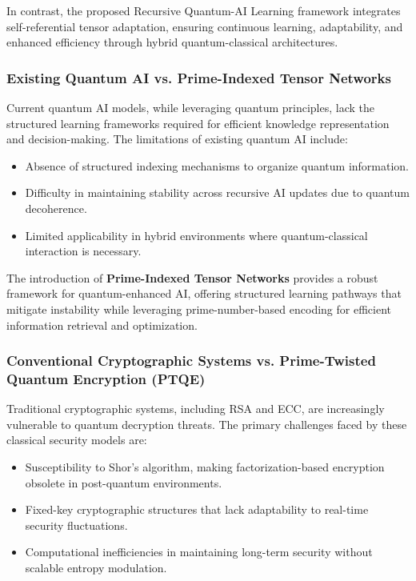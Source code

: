 \documentclass{article}
\theoremstyle{plain}
\begin{document}
In contrast, the proposed Recursive Quantum-AI Learning framework integrates self-referential tensor adaptation, ensuring continuous learning, adaptability, and enhanced efficiency through hybrid quantum-classical architectures.

\subsubsection{Existing Quantum AI vs. Prime-Indexed Tensor Networks}

Current quantum AI models, while leveraging quantum principles, lack the structured learning frameworks required for efficient knowledge representation and decision-making. The limitations of existing quantum AI include:
\begin{itemize}
    \item Absence of structured indexing mechanisms to organize quantum information.
    \item Difficulty in maintaining stability across recursive AI updates due to quantum decoherence.
    \item Limited applicability in hybrid environments where quantum-classical interaction is necessary.
\end{itemize}

The introduction of \textbf{Prime-Indexed Tensor Networks} provides a robust framework for quantum-enhanced AI, offering structured learning pathways that mitigate instability while leveraging prime-number-based encoding for efficient information retrieval and optimization.

\subsubsection{Conventional Cryptographic Systems vs. Prime-Twisted Quantum Encryption (PTQE)}

Traditional cryptographic systems, including RSA and ECC, are increasingly vulnerable to quantum decryption threats. The primary challenges faced by these classical security models are:
\begin{itemize}
    \item Susceptibility to Shor’s algorithm, making factorization-based encryption obsolete in post-quantum environments.
    \item Fixed-key cryptographic structures that lack adaptability to real-time security fluctuations.
    \item Computational inefficiencies in maintaining long-term security without scalable entropy modulation.
\end{itemize}
\end{document}
